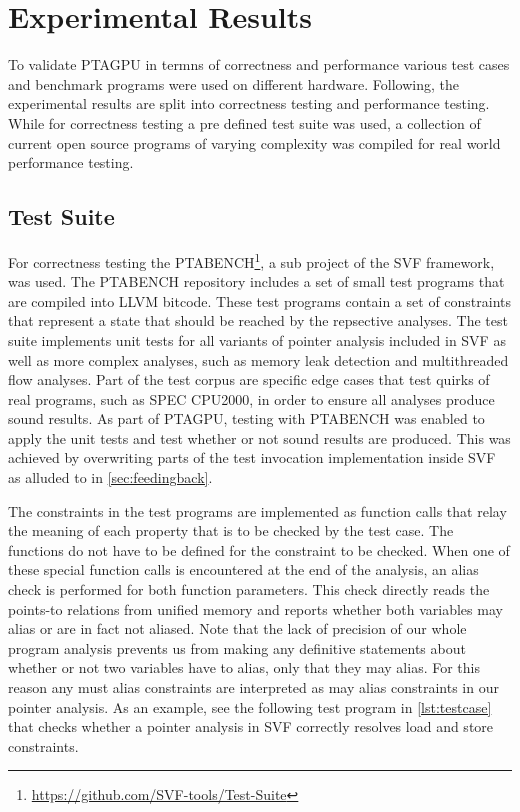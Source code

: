 \section{Experimental Results}
To validate PTAGPU in termns of correctness and performance various test cases and benchmark programs were used on different hardware.
Following, the experimental results are split into correctness testing and performance testing.
While for correctness testing a pre defined test suite was used, a collection of current open source programs of varying complexity was compiled for real world performance testing.

\subsection{Test Suite}\label{sec:testsuite}
For correctness testing the PTABENCH\footnote{\url{https://github.com/SVF-tools/Test-Suite}}, a sub project of the SVF framework, was used.
The PTABENCH repository includes a set of small test programs that are compiled into LLVM bitcode. These test programs contain a set of constraints that represent a state that should be reached by the repsective analyses.
The test suite implements unit tests for all variants of pointer analysis included in SVF as well as more complex analyses, such as memory leak detection and multithreaded flow analyses. 
Part of the test corpus are specific edge cases that test quirks of real programs, such as SPEC CPU2000, in order to ensure all analyses produce sound results.
As part of PTAGPU, testing with PTABENCH was enabled to apply the unit tests and test whether or not sound results are produced.
This was achieved by overwriting parts of the test invocation implementation inside SVF as alluded to in \autoref{sec:feedingback}.

The constraints in the test programs are implemented as function calls that relay the meaning of each property that is to be checked by the test case. The functions do not have to be defined for the constraint to be checked.
When one of these special function calls is encountered at the end of the analysis, an alias check is performed for both function parameters.
This check directly reads the points-to relations from unified memory and reports whether both variables may alias or are in fact not aliased.
Note that the lack of precision of our whole program analysis prevents us from making any definitive statements about whether or not two variables have to alias, only that they may alias. For this reason any must alias constraints are interpreted as may alias constraints in our pointer analysis.
As an example, see the following test program in \autoref{lst:testcase} that checks whether a pointer analysis in SVF correctly resolves load and store constraints.

